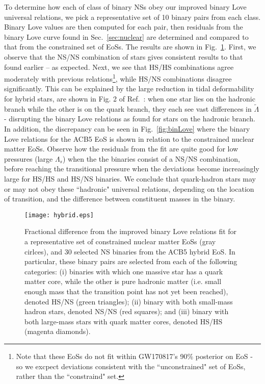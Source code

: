 \documentclass[prd,twocolumn,nofootinbib,superscriptaddress,amsmath,amssymb]{revtex4-1}
\begin{document}
To determine how each of class of binary NSs obey our improved binary Love universal relations, we pick a representative set of 10 binary pairs from each class.
Binary Love values are then computed for each pair, then residuals from the binary Love curve found in Sec.~\ref{sec:nuclear} are determined and compared to that from the constrained set of EoSs.
The results are shown in Fig.~\ref{fig:hybrid}.
First, we observe that the NS/NS combination of stars gives consistent results to that found earlier -- as expected.
Next, we see that HS/HS combinations agree moderately with previous relations\footnote{Note that these EoSs do not fit within GW170817's 90\% posterior on EoS - so we excpect deviations consistent with the ``unconstrained" set of EoSs, rather than the ``constraind" set.}, while HS/NS combinations disagree significantly.
This can be explained by the large reduction in tidal deformability for hybrid stars, are shown in Fig. 2 of Ref.~\cite{Paschalidis2018}: when one star lies on the hadronic branch while the other is on the quark branch, they each see vast differences in $\tilde{\Lambda}$ - disrupting the binary Love relations as found for stars on the hadronic branch.
In addition, the discrepancy can be seen in Fig.~\ref{fig:binLove} where the binary Love relations for the ACB5 EoS is shown in relation to the constrained nuclear matter EoSs.
Observe how the residuals from the fit are quite good for low pressures (large $\Lambda_s$) when the the binaries consist of a NS/NS combination, before reaching the transitional pressure when the deviations become increasingly large for HS/HS and HS/NS binaries.
We conclude that quark-hadron stars may or may not obey these ``hadronic" universal relations, depending on the location of transition, and the difference between constituent masses in the binary.
\begin{figure}
\begin{center} 
\texttt{[image: hybrid.eps]}
\end{center}
\caption{
Fractional difference from the improved binary Love relations fit for a representative set of constrained nuclear matter EoSs (gray cirlces), and 30 selected NS binaries from the ACB5 hybrid EoS.
In particular, these binary pairs are selected from each of the following categories: (i) binaries with which one massive star has a quark matter core, while the other is pure hadronic matter (i.e. small enough mass that the transition point has not yet been reached), denoted HS/NS (green triangles); (ii) binary with both small-mass hadron stars, denoted NS/NS (red squares); and (iii) binary with both large-mass stars with quark matter cores, denoted HS/HS (magenta diamonds).
}
\label{fig:hybrid}
\end{figure} 
\end{document}
